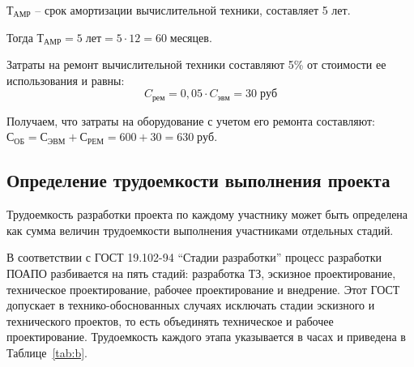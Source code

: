 $Т_{АМР}$ – срок амортизации вычислительной техники, составляет 5 лет. 

Тогда $Т_{АМР} = 5 \; лет =5 \cdot 12 = 60 \; месяцев $.

Затраты на ремонт вычислительной техники составляют 5\% от  стоимости ее использования и равны:
$$C_{рем} = 0,05 \cdot C_{эвм} = 30 \; руб$$

Получаем, что  затраты на оборудование с учетом его ремонта составляют:
$ С_{ОБ} = С_{ЭВМ} + С_{РЕМ} =  600 + 30 = 630 \; руб$.

\subsection{Определение трудоемкости выполнения проекта}
Трудоемкость разработки проекта по каждому участнику может быть определена как сумма величин трудоемкости выполнения участниками отдельных стадий.

В соответствии с ГОСТ 19.102-94 “Стадии разработки” процесс разработки ПОАПО разбивается на пять стадий: разработка ТЗ, эскизное проектирование, техническое проектирование, рабочее проектирование и внедрение. Этот ГОСТ допускает в технико-обоснованных случаях исключать стадии эскизного и технического проектов, то есть объединять техническое и рабочее проектирование. Трудоемкость каждого этапа указывается в часах и приведена в  Таблице~\ref{tab:b}.

